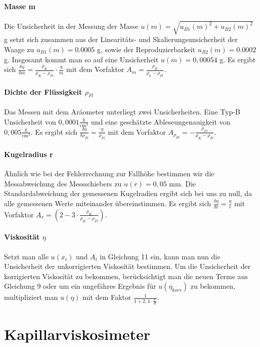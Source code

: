 \documentclass{article}
\begin{document}
\paragraph{Masse m}
Die Unsicherheit in der Messung der Masse $u(m) = \sqrt{u_{B1}(m)^2 + u_{B2}(m)^2}$ g setzt sich zusammen aus der Linearitäts- und Skalierungsunsicherheit der Waage zu $u_{B1}(m)= 0.0005$ g, sowie der Reproduzierbarkeit $u_{B2}(m)= 0.0002$ g. Insgesamt kommt man so auf eine Unsicherheit $u(m)=0,00054$ g. Es ergibt sich $\frac{\delta  \eta}{\delta m} = \frac{\rho_K}{\rho_K - \rho_{Fl}} \cdot \frac{\eta}{m}$ mit dem Vorfaktor $A_m = \frac{\rho_K}{\rho_k - \rho_{Fl}}$. 
\paragraph{Dichte der Flüssigkeit $\rho_{Fl}$}
Das Messen mit dem Aräometer unterliegt zwei Unsicherheiten. Eine Typ-B Unsicherheit von $0,0001 \frac{\textrm{g}}{\textrm{cm}^3}$ \cite{6} und eine geschätzte Ableseungenauigkeit von $0,005 \frac{\textrm{g}}{\textrm{cm}^3}$. Es ergibt sich $\frac{\delta \eta}{\delta \rho_{Fl}} = \frac{\eta}{\rho_{Fl}}$ mit dem Vorfaktor $A_{\rho_{Fl}} = - \frac{\rho_{Fl}}{\rho_K - \rho_{Fl}}$. 
\paragraph{Kugelradius r}
Ähnlich wie bei der Fehlerrechnung zur Fallhöhe bestimmen wir die Messabweichung des Messschiebers zu $u(r)=0,05$ mm.
Die Standardabweichung der gemessenen Kugelradien ergibt sich bei uns zu null, da alle gemessenen Werte miteinander übereinstimmen. Es ergibt sich $\frac{\delta \eta}{\delta r}=\frac{\eta}{r}$ mit Vorfaktor $A_{r} = (2-3 \cdot \frac{\rho_K}{\rho_K - \rho_{Fl}})$.
\paragraph{Viskosität $\eta$}
Setzt man alle $u(x_i)$ und $A_i$ in Gleichung 11 ein, kann man nun die Unsicherheit der unkorrigierten Viskosität bestimmen. Um die Unsicherheit der korrigierten Viskosität zu bekommen, berücksichtigt man die neuen Terme aus Gleichung 9 oder um ein ungefähres Ergebnis für $u(\eta_{korr})$ zu bekommen, multipliziert man $u(\eta)$ mit dem Faktor $\frac{1}{1+2,4 \cdot \frac{r}{R}}$.
\section{Kapillarviskosimeter}
\end{document}
